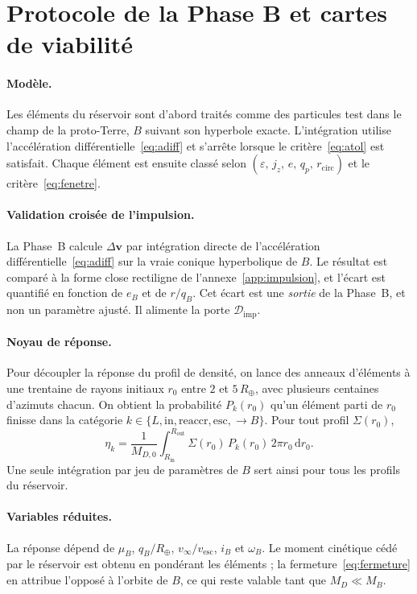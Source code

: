 \documentclass[11pt,a4paper,openany]{report}
\newcommand{\Rt}{R_{\oplus}}
\newcommand{\dd}{\mathrm{d}}
\begin{document}

\section{Protocole de la Phase B et cartes de viabilité}

\paragraph{Modèle.}
Les éléments du réservoir sont d'abord traités comme des particules test dans le champ de la
proto-Terre, $B$ suivant son hyperbole exacte. L'intégration utilise l'accélération
différentielle~\eqref{eq:adiff} et s'arrête lorsque le critère~\eqref{eq:atol} est satisfait. Chaque
élément est ensuite classé selon $(\varepsilon,\,j_z,\,e,\,q_p,\,r_{\mathrm{circ}})$ et le
critère~\eqref{eq:fenetre}.

\paragraph{Validation croisée de l'impulsion.}
La Phase~B calcule $\Delta\mathbf{v}$ par intégration directe de l'accélération
différentielle~\eqref{eq:adiff} sur la vraie conique hyperbolique de $B$. Le résultat est comparé à
la forme close rectiligne de l'annexe~\ref{app:impulsion}, et l'écart est quantifié en fonction de
$e_B$ et de $r/q_B$. Cet écart est une \emph{sortie} de la Phase~B, et non un paramètre ajusté. Il
alimente la porte $\mathcal{D}_{\mathrm{imp}}$.

\paragraph{Noyau de réponse.}
Pour découpler la réponse du profil de densité, on lance des anneaux d'éléments à une trentaine
de rayons initiaux $r_0$ entre $2$ et $5\,\Rt$, avec plusieurs centaines d'azimuts chacun. On obtient
la probabilité $P_k(r_0)$ qu'un élément parti de $r_0$ finisse dans la catégorie
$k\in\{L,\mathrm{in},\mathrm{reaccr},\mathrm{esc},\to B\}$. Pour tout profil $\Sigma(r_0)$,
\begin{equation}
\eta_k=\frac{1}{M_{D,0}}\int_{R_{\mathrm{in}}}^{R_{\mathrm{out}}}\Sigma(r_0)\,P_k(r_0)\,2\pi r_0\,\dd r_0.
\label{eq:noyau}
\end{equation}
Une seule intégration par jeu de paramètres de $B$ sert ainsi pour tous les profils du réservoir.

\paragraph{Variables réduites.}
La réponse dépend de $\mu_B$, $q_B/\Rt$, $v_\infty/v_{\mathrm{esc}}$, $i_B$ et $\omega_B$. Le moment
cinétique cédé par le réservoir est obtenu en pondérant les éléments ; la
fermeture~\eqref{eq:fermeture} en attribue l'opposé à l'orbite de $B$, ce qui reste valable tant que
$M_D\ll M_B$.
\end{document}
